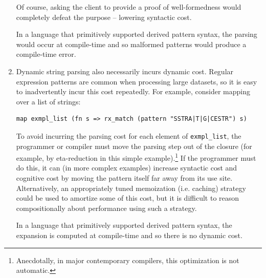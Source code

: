 \begin{enumerate}
Of course, asking the client to provide a proof of well-formedness would completely defeat the purpose -- lowering syntactic cost.

In a language that primitively supported derived pattern syntax, the parsing would occur at compile-time and so malformed patterns would produce a compile-time error.

\item Dynamic string parsing also necessarily incurs dynamic cost. Regular expression patterns are common when processing large datasets, so it is easy to inadvertently incur this cost repeatedly. For example, consider mapping over a list of strings:
\begin{lstlisting}[numbers=none]
map exmpl_list (fn s => rx_match (pattern "SSTRA|T|G|CESTR") s)
\end{lstlisting}
To avoid incurring the parsing cost for each element of \lstinline{exmpl_list}, the programmer or compiler must move the parsing step out of the closure (for example, by eta-reduction in this simple example).\footnote{Anecdotally, in major contemporary compilers, this optimization is not automatic.} If the programmer must do this, it can (in more complex examples) increase syntactic cost and cognitive cost by moving the pattern itself far away from its use site. Alternatively, an appropriately tuned memoization (i.e. caching) strategy could be used to amortize some of this cost, but it is difficult to reason compositionally about performance using such a strategy. %


In a language that primitively supported derived pattern syntax, the expansion is computed at compile-time and so there is no dynamic cost.
\end{enumerate}


